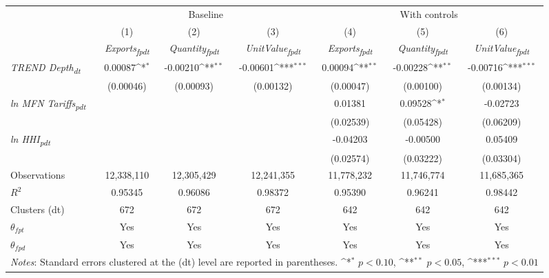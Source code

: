 {
\def\sym#1{\ifmmode^{#1}\else\(^{#1}\)\fi}
\begin{tabular}{l*{6}{c}}
\toprule
&\multicolumn{3}{c}{Baseline}&\multicolumn{3}{c}{With controls}\\\cmidrule(lr){2-4}\cmidrule(lr){5-7}
&(1)&(2)&(3)&(4)&(5)&(6)\\
&\textit{Exports\textsubscript{fpdt}}&\textit{Quantity\textsubscript{fpdt}}&\textit{UnitValue\textsubscript{fpdt}}&\textit{Exports\textsubscript{fpdt}}&\textit{Quantity\textsubscript{fpdt}}&\textit{UnitValue\textsubscript{fpdt}}\\
\midrule
\textit{TREND Depth\textsubscript{dt}} & 0.00087\sym{*} & -0.00210\sym{**} & -0.00601\sym{***} & 0.00094\sym{**} & -0.00228\sym{**} & -0.00716\sym{***}\\
 & (0.00046) & (0.00093) & (0.00132) & (0.00047) & (0.00100) & (0.00134)\\
\addlinespace
\textit{ln MFN Tariffs\textsubscript{pdt}} &  &  &  & 0.01381 & 0.09528\sym{*} & -0.02723\\
 &  &  &  & (0.02539) & (0.05428) & (0.06209)\\
\addlinespace
\textit{ln HHI\textsubscript{pdt}} &  &  &  & -0.04203 & -0.00500 & 0.05409\\
 &  &  &  & (0.02574) & (0.03222) & (0.03304)\\
\midrule
Observations & 12,338,110 & 12,305,429 & 12,241,355 & 11,778,232 & 11,746,774 & 11,685,365\\
$R^{2}$ & 0.95345 & 0.96086 & 0.98372 & 0.95390 & 0.96241 & 0.98442\\
Clusters (dt) & 672 & 672 & 672 & 642 & 642 & 642\\
$\theta_{fpt}$ & Yes & Yes & Yes & Yes & Yes & Yes\\
$\theta_{fpd}$ & Yes & Yes & Yes & Yes & Yes & Yes\\
\bottomrule
\multicolumn{7}{l}{\footnotesize \textit{Notes}: Standard errors clustered at the (dt) level are reported in parentheses. \sym{*} \(p<0.10\), \sym{**} \(p<0.05\), \sym{***} \(p<0.01\)}\\
\end{tabular}
}
